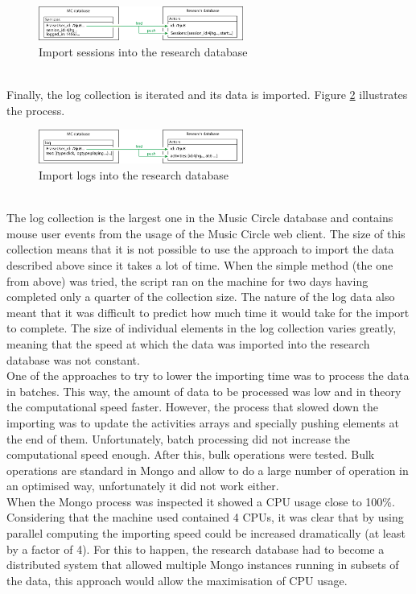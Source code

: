 \documentclass[11pt, oneside]{article}   	%
\begin{document}
\begin{figure}[h!]
  \centering
    \includegraphics[width=0.6\textwidth]{./sessions.png}
      \caption{Import sessions into the research database}
      \label{figure:sessions}
\end{figure}
\\Finally, the log collection is iterated and its data is imported. Figure \ref{figure:logImport} illustrates the process.
\begin{figure}[h!]
  \centering
    \includegraphics[width=0.6\textwidth]{./log.png}
      \caption{Import logs into the research database}
      \label{figure:logImport}
\end{figure}
\\The log collection is the largest one in the Music Circle database and contains mouse user events from the usage of the Music Circle web client. The size of this collection means that it is not possible to use the approach to import the data described above since it takes a lot of time. When the simple method (the one from above) was tried, the script ran on the machine for two days having completed only a quarter of the collection size. The nature of the log data also meant that it was difficult to predict how much time it would take for the import to complete. The size of individual elements in the log collection varies greatly, meaning that the speed at which the data was imported into the research database was not constant.\\
One of the approaches to try to lower the importing time was to process the data in batches. This way, the amount of data to be processed was low and in theory the computational speed faster. However, the process that slowed down the importing was to update the activities arrays and specially pushing elements at the end of them. Unfortunately, batch processing did not increase the computational speed enough. After this, bulk operations were tested. Bulk operations are standard in Mongo and allow to do a large number of operation in an optimised way, unfortunately it did not work either.\\
When the Mongo process was inspected it showed a CPU usage close to 100\%. Considering that the machine used contained 4 CPUs, it was clear that by using parallel computing the importing speed could be increased dramatically (at least by a factor of 4). For this to happen, the research database had to become a distributed system that allowed multiple Mongo instances running in subsets of the data, this approach would allow the maximisation of CPU usage.
\end{document}
